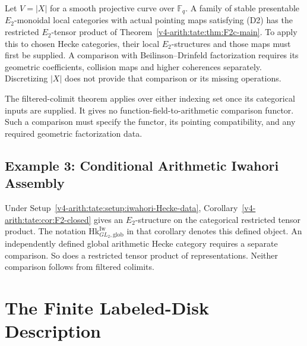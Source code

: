 \begin{example}
\label{v4-arith:tate:ex:function-field}
Let \(V=|X|\) for a smooth projective curve over \(\mathbb F_q\).
A family of stable presentable \(E_2\)-monoidal local categories
with actual pointing maps satisfying (D2) has the restricted
\(E_2\)-tensor product of
Theorem~\ref{v4-arith:tate:thm:F2c-main}. To apply this to chosen
Hecke categories, their local \(E_2\)-structures and those maps
must first be supplied. A comparison with Beilinson--Drinfeld
factorization requires its geometric coefficients, collision
maps and higher coherences separately. Discretizing \(|X|\)
does not provide that comparison or its missing operations.
\end{example}

\begin{remark}
\label{v4-arith:tate:rem:ff-vs-arith}
The filtered-colimit theorem applies over either indexing set
once its categorical inputs are supplied. It gives no
function-field-to-arithmetic comparison functor. Such a
comparison must specify the functor, its pointing compatibility,
and any required geometric factorization data.
\end{remark}

\subsection{Example 3: Conditional Arithmetic Iwahori Assembly}

\begin{example}
\label{v4-arith:tate:ex:arith-iwahori}
Under Setup~\ref{v4-arith:tate:setup:iwahori-Hecke-data},
Corollary~\ref{v4-arith:tate:cor:F2-closed} gives an
\(E_2\)-structure on the categorical restricted tensor product.
The notation \(\mathrm{Hk}^{\mathrm{Iw}}_{GL_2,\mathrm{glob}}\)
in that corollary denotes this defined object. An independently
defined global arithmetic Hecke category requires a separate
comparison. So does a restricted tensor product of representations.
Neither comparison follows from filtered colimits.
\end{example}

\section{The Finite Labeled-Disk Description}
\label{v4-arith:tate:verification}

